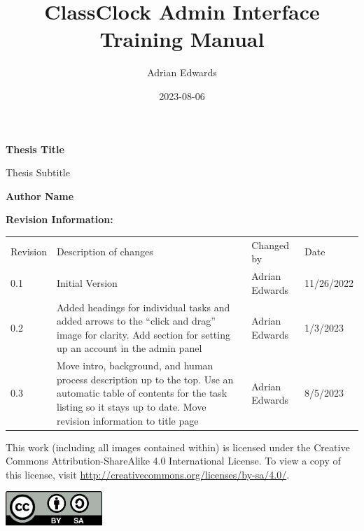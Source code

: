 \documentclass{article}
\title{ClassClock Admin Interface Training Manual}
\author{Adrian Edwards}
\date{2023-08-06}
\begin{document}
\begin{titlepage}
    
	\begin{FlushRight}
		\vspace*{1cm}
			
		\Huge
		\textbf{Thesis Title}
			
		\vspace{0.5cm}
		\LARGE
		Thesis Subtitle
			
		\vspace{1.5cm}
			
		\textbf{Author Name}
	\end{FlushRight}

	\normalsize
	\textbf{Revision Information:}\\
	\begin{FlushLeft}
		\begin{tabularx}{\textwidth}{m{3.5em}Xm{1.4233599in}m{0.8615598in}}
		{Revision} &
		{Description of changes} &
		{Changed by} &
		{Date}\\

		{0.1} &
		{Initial Version} &
		{Adrian Edwards} &
		{11/26/2022}\\

		{0.2} &
		{Added headings for individual tasks and added arrows to the “click and drag” image for
		clarity. Add section for setting up an account in the admin panel} &
		{Adrian Edwards} &
		{1/3/2023}\\

		{0.3} &
		{Move intro, background, and human process description up to the top. Use an automatic table of
		contents for the task listing so it stays up to date. Move revision information to title page} &
		{Adrian Edwards} &
		{8/5/2023}\\
	\end{tabularx}
	\end{FlushLeft}
		
	\vfill
	\begin{center}
        
		{This work (including all images contained within) is licensed under the Creative Commons Attribution-ShareAlike 4.0
		International License. To view a copy of this license, visit \href{http://creativecommons.org/licenses/by-sa/4.0/}{http://creativecommons.org/licenses/by-sa/4.0/}.}



		\includegraphics[width=1.439in,height=0.5043in]{Mini20Manual-img001.png}
            
    \end{center}
\end{titlepage}
\clearpage
\end{document}
